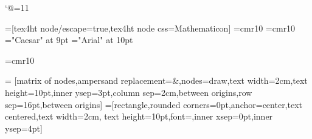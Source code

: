 \catcode`@=11\relax






\def\LD@Exercice@Display@Code{\LD@Option@@Label\qquad\eightpts}%
\LD@Exo@Label@Hide
\LD@Colors@Hide
\overfullrule=0pt%

	
\ifHtml
	
	=[tex4ht node/escape=true,tex4ht node css=Mathematicon]%
	\font\LD@Font@ResMathematica=cmr10%
	\font\LD@Font@Arial=cmr10%
\else
	\LD@AFour@Book
	\font\LD@Font@ResMathematica="Caesar" at 9pt
	\font\LD@Font@Arial="Arial" at 10pt
\fi


\def\pgfutil@EveryShipout@Output{%
  \setbox255=\vbox{%
    \setbox0=\hbox{\pgfutil@abe\pgfutil@abc\global\let\pgfutil@abc\pgfutil@empty}%
    \wd0=0pt%
    \ht0=0pt%
    \dp0=0pt%
    \box0%
    \makeheadline
    \unvbox255%
    \makefootline
  }%
  \pgfutil@@EveryShipout@Org@Shipout\box\@cclv%
}


\def\LD@Public@Star{PT*}%

\def\Red#1{#1}%
\def\Blue#1{#1}%
\def\pspicture#1\endpspicture{}%
\long\def\IGNORE#1\IGNORE{}%

\font\SvgText=cmr10\relax


\tenrm

\def\TipSection{}%
\def\Tip#1{\ifHtml\Par\fi\EA\sidx\EA{\TipSection!#1}}%

\def\LD@Index@List{%
	Théorèmes,Théorème,Formules,Formule,Propriétés,Propriété,%
	Inégalités,Inégalité,Identités,Identité,Inégalités,Inégalité,%
	Distance,Intersection,Raisonnement,Récurrence,Relations,Relation,Point,%
	Lien,Espaces vectoriels,Espace vectoriel,Suites,Interprétation,%
	Fonctions,Produit,Loi,Déterminant,Principe,%
	Opérateur logique,Equation,Aire,Volume,Changement%
}%

= [matrix of nodes,ampersand replacement=\&,nodes={draw,text width=2cm,text height=10pt,inner ysep=3pt},column sep={2cm,between origins},row sep={16pt,between origins}]
=[rectangle,rounded corners=0pt,anchor=center,text centered,text width=2cm, text height=10pt,font=\SvgText,inner xsep=0pt,inner ysep=4pt]







